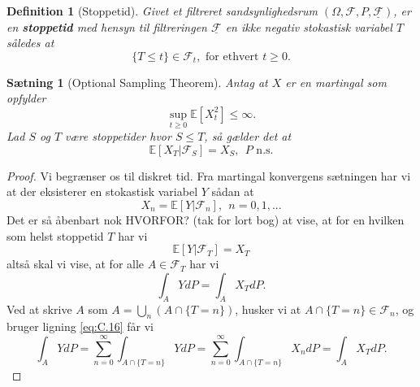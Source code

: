 \documentclass[12pt]{report}
\newtheorem{theorem}[lemma]{Sætning}
\newtheorem{definition}[lemma]{Definition}
\theoremstyle{break}
\newtheorem*{proof}{Bevis}
\theoremstyle{break}
\newcommand{\EE}{\mathbb{E}}
\newcommand{\FI}{\mathcal{F}}
\newcommand{\FIU}{\underline{\mathcal{F}}}
\newcommand{\1}{\mathds{1}}
\begin{document}
\begin{definition}[Stoppetid]
	Givet et filtreret sandsynlighedsrum $(\Omega, \FI, P, \FIU)$, er en \textbf{stoppetid} med hensyn til filtreringen $\FIU$ en ikke negativ stokastisk variabel $T$ således at
	\[ \{T\leq t\}\in\FI_t, \text{ for ethvert }t\geq 0.\]
\end{definition}
\begin{theorem}[Optional Sampling Theorem]
	Antag at $X$ er en martingal som opfylder
	\[ \sup\limits_{t\geq 0}\EE\left[ X_t^2 \right] \leq \infty.\]
	Lad $S$ og $T$ være stoppetider hvor $S\leq T$, så gælder det at
	\[ \EE\left[ X_T\vert \FI_S \right]=X_S, ~~ P \text{  n.s.} \]
\end{theorem}
\begin{proof}
	Vi begrænser os til diskret tid. Fra martingal konvergens sætningen har vi at der eksisterer en stokastisk variabel $Y$ sådan at 
	\begin{equation}\label{eq:C.16}
		X_n=\EE\left[ Y\vert \FI_n \right], ~~n=0,1,...
	\end{equation}
	Det er så åbenbart nok HVORFOR? (tak for lort bog) at vise, at for en hvilken som helst stoppetid $T$ har vi
	\[ \EE\left[ Y\vert \FI_T \right]=X_T \]
	altså skal vi vise, at for alle $A\in\FI_T$ har vi 
	\[ \int_{A} Y dP=\int_A X_T dP. \]
	Ved at skrive $A$ som $A=\bigcup_n(A\cap\{T=n\})$, husker vi at $A\cap\{T=n\}\in \FI_n$, og bruger ligning \ref{eq:C.16} får vi
	\[ \int_A YdP=\sum\limits_{n=0}^{\infty}\int_{A\cap \{T=n\}} YdP= \sum\limits_{n=0}^{\infty}\int_{A\cap \{T=n\}} X_n dP= \int_A X_T dP.\]
\end{proof}
\newpage
\end{document}
